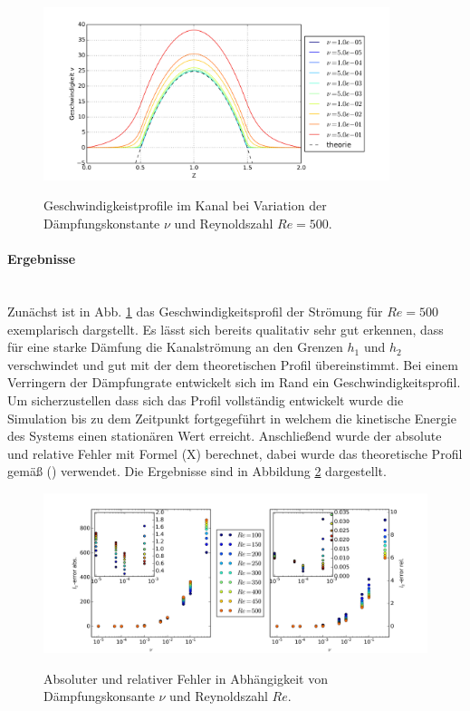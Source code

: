 \begin{figure}[!hbtp]
  \centering
  \includegraphics[width=0.9\textwidth]{gfx/immersed_boundary/vp_flow.png}\label{fig:vp_flow}
  \caption{Geschwindigkeistprofile im Kanal bei Variation der Dämpfungskonstante $\nu$ und Reynoldszahl $Re=500$.}
\end{figure}


\paragraph*{Ergebnisse}\mbox{}\\
Zunächst ist in Abb. \ref{fig:vp_flow} das Geschwindigkeitsprofil der Strömung für $Re=500$ exemplarisch dargstellt. Es lässt sich bereits qualitativ sehr gut erkennen, dass für eine
starke Dämfung die Kanalströmung an den Grenzen $h_1$ und $h_2$ verschwindet und gut mit der dem theoretischen Profil übereinstimmt.
Bei einem Verringern der Dämpfungrate entwickelt sich im Rand ein Geschwindigkeitsprofil.
Um sicherzustellen dass sich das Profil vollständig entwickelt wurde die Simulation bis zu dem Zeitpunkt fortgegeführt
 in welchem die kinetische Energie des Systems einen stationären Wert erreicht. Anschließend wurde der absolute und relative Fehler mit Formel (X) berechnet,
dabei wurde das theoretische Profil gemäß () verwendet. Die Ergebnisse sind in Abbildung \ref{fig:vp_error} dargestellt.

\begin{figure}[!bp]
  \centering
  \includegraphics[width=1.0\textwidth]{gfx/immersed_boundary/vp_error.png}\label{fig:vp_error}
  \caption{Absoluter und relativer Fehler in Abhängigkeit von Dämpfungskonsante $\nu$ und Reynoldszahl $Re$.}
\end{figure}


